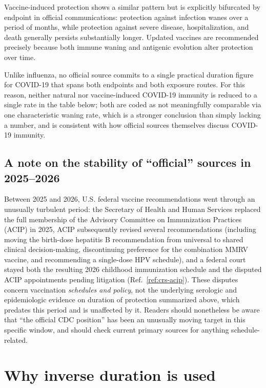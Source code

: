 \documentclass[11pt]{article}
\begin{document}
Vaccine-induced protection shows a similar pattern but is explicitly
bifurcated by endpoint in official communications: protection against
infection wanes over a period of months, while protection against severe
disease, hospitalization, and death generally persists substantially
longer. Updated vaccines are recommended precisely because both immune
waning and antigenic evolution alter protection over time.

Unlike influenza, no official source commits to a single practical duration
figure for COVID-19 that spans both endpoints and both exposure routes.
For this reason, neither natural nor vaccine-induced COVID-19 immunity is
reduced to a single rate in the table below; both are coded as not
meaningfully comparable via one characteristic waning rate, which is a
stronger conclusion than simply lacking a number, and is consistent with
how official sources themselves discuss COVID-19 immunity.

\subsection{A note on the stability of ``official'' sources in 2025--2026}

Between 2025 and 2026, U.S. federal vaccine recommendations went through an
unusually turbulent period: the Secretary of Health and Human Services
replaced the full membership of the Advisory Committee on Immunization
Practices (ACIP) in 2025, ACIP subsequently revised several recommendations
(including moving the birth-dose hepatitis B recommendation from universal
to shared clinical decision-making, discontinuing preference for the
combination MMRV vaccine, and recommending a single-dose HPV schedule), and
a federal court stayed both the resulting 2026 childhood immunization
schedule and the disputed ACIP appointments pending litigation
(Ref.~\ref{ref:crs-acip}). These disputes concern vaccination
\emph{schedules and policy}, not the underlying serologic and
epidemiologic evidence on duration of protection summarized above, which
predates this period and is unaffected by it. Readers should nonetheless be
aware that ``the official CDC position'' has been an unusually moving
target in this specific window, and should check current primary sources
for anything schedule-related.

\section{Why inverse duration is used}
\end{document}
